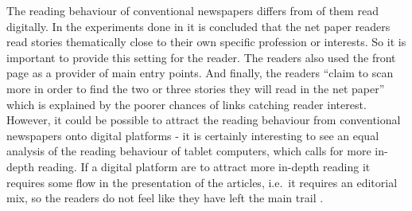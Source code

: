 The reading behaviour of conventional newspapers differs from of them read digitally. In the experiments done in \cite{holmqvist2003reading} it is concluded that the net paper readers read stories thematically close to their own specific profession or interests. So it is important to provide this setting for the reader. The readers also used the front page as a provider of main entry points. And finally, the readers ``claim to scan more in order to find the two or three stories they will read in the net paper'' which is explained by the poorer chances of links catching reader interest. However, it could be possible to attract the reading behaviour from conventional newspapers onto digital platforms - it is certainly interesting to see an equal analysis of the reading behaviour of tablet computers, which calls for more in-depth reading. If a digital platform are to attract more in-depth reading it requires some flow in the presentation of the articles, i.e.\ it requires an editorial mix, so the readers do not feel like they have left the main trail \cite{holmqvist2003reading}.
%
%
%

